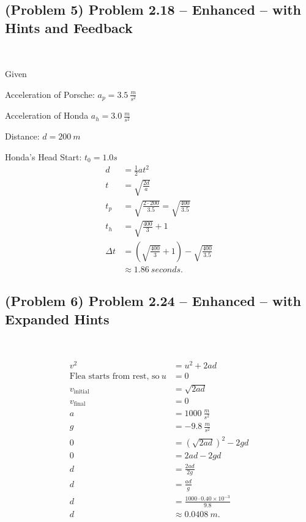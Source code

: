 \newpage

\subsection{(Problem 5) Problem 2.18 -- Enhanced -- with Hints and Feedback}

~

\begin{solution}

	Given

	Acceleration of Porsche: $a_p = \SI{3.5}{\frac{m}{s^2}}$

	Acceleration of Honda $a_h = \SI{3.0}{\frac{m}{s^2}}$

	Distance: $d=\SI{200}{m}$

	Honda's Head Start: $t_0 = 1.0s$
	\begin{align*}
		d &= \frac{1}{2}at^2 \\
		t &= \sqrt{\frac{2d}{a}} \\
		t_p &= \sqrt{\frac{2 \cdot 200}{3.5}} = \sqrt{\frac{400}{3.5}}   \\
		t_h &= \sqrt{\frac{400}{3}} + 1 \\
		\Delta t &= \left( \sqrt{\frac{400}{3}} + 1 \right) - \sqrt{\frac{400}{3.5}} \\
		&\approx \SI{1.86}{seconds}
		.\end{align*}

\end{solution}

\newpage

\subsection{(Problem 6) Problem 2.24 -- Enhanced -- with Expanded Hints}

~

\begin{solution}
	\begin{align*}
		v^2 &= u^2 + 2ad \\
		\text{Flea starts from rest, so} ~ u &= 0 \\
		v_{\mathrm{initial}} &= \sqrt{2ad} \\
		v_{\mathrm{final}} &= 0 \\
		a &= \SI{1000}{\frac{m}{s^2}} \\
		g &= \SI{-9.8}{\frac{m}{s^2}} \\
		0 &= \left( \sqrt{2ad}  \right)^2 - 2gd \\
		0 &= 2ad-2gd \\
		d &= \frac{2ad}{2g} \\
		d &= \frac{ad}{g} \\
		d &= \frac{1000 \cdot 0.40 \times 10^{-3}}{9.8} \\
		d &\approx \SI{0.0408}{m}
		.\end{align*}
\end{solution}

